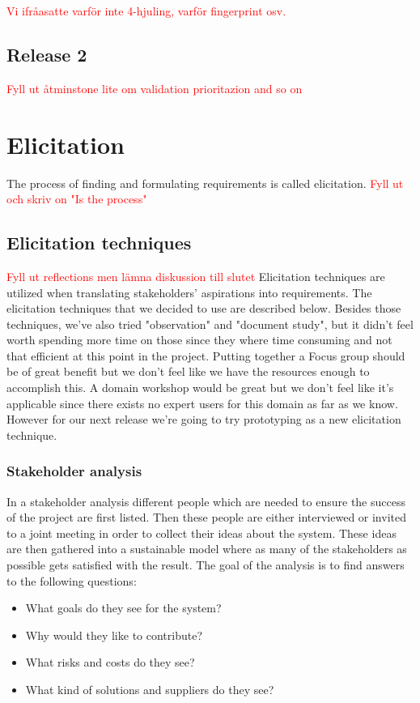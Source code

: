 \documentclass[10pt]{article}
\newcommand\todo[1]{\textcolor{red}{#1}}
\begin{document}
\todo{Vi ifråasatte varför inte 4-hjuling, varför fingerprint osv.}

\subsection{Release 2}
\todo{Fyll ut åtminstone lite om validation prioritazion and so on}

\section{Elicitation}
\sloppy
\noindent The process of finding and formulating requirements is called elicitation.
\todo{Fyll ut och skriv on "Is the process"}

\subsection{Elicitation techniques}
\todo{Fyll ut reflections men lämna diskussion till slutet}
Elicitation techniques are utilized when translating stakeholders' aspirations into requirements.
The elicitation techniques that we decided to use are described below.
Besides those techniques, we've also tried "observation" and "document study", but it didn't feel worth spending more time on those since they where time consuming and not that efficient at this point in the project.
Putting together a Focus group should be of great benefit but we don’t feel like we have the resources enough to accomplish this.
A domain workshop would be great but we don't feel like it's applicable since there exists no expert users for this domain as far as we know.
However for our next release we're going to try prototyping as a new elicitation technique.

\subsubsection{Stakeholder analysis}
In a stakeholder analysis different people which are needed to ensure the success of the project are first listed. Then these people are either interviewed or invited to a joint meeting in order to collect their ideas about the system. These ideas are then gathered into a sustainable model where as many of the stakeholders as possible gets satisfied with the result. The goal of the analysis is to find answers to the following questions:
\begin{itemize}
\item What goals do they see for the system?
\item Why would they like to contribute?
\item What risks and costs do they see?
\item What kind of solutions and suppliers do they see?
\end{itemize}
\end{document}
